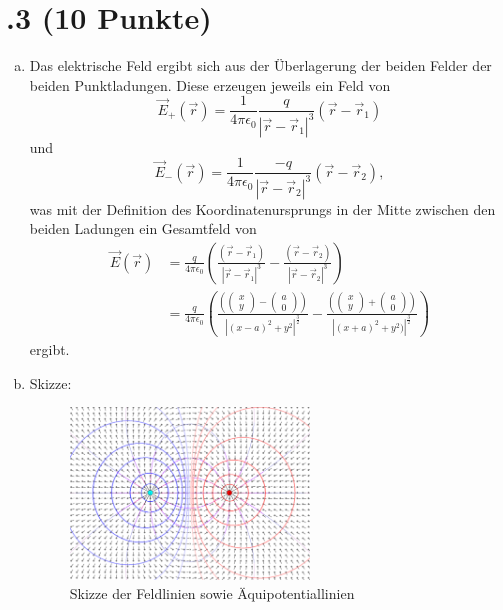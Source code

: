 \section*{\nr.3 \titthree (10 Punkte)}
\begin{enumerate}[(a)]
\item Das elektrische Feld ergibt sich aus der Überlagerung der beiden Felder der beiden Punktladungen. Diese erzeugen jeweils ein Feld von
\begin{equation}
  \vec E_+(\vec r)= \frac{1}{4 \pi \epsilon_0}\frac{q}{|\vec r - \vec r_1|^3}(\vec r - \vec r_1)
\end{equation}
und
\begin{equation}
  \vec E_-(\vec r)= \frac{1}{4 \pi \epsilon_0}\frac{-q}{|\vec r - \vec r_2|^3}(\vec r - \vec r_2),
\end{equation}
was mit der Definition des Koordinatenursprungs in der Mitte zwischen den beiden Ladungen ein Gesamtfeld von
\begin{align}
  \vec E(\vec r) &= \frac{q}{4 \pi \epsilon_0}\left(\frac{(\vec r - \vec r_1)}{|\vec r - \vec r_1|^3}-\frac{(\vec r - \vec r_2)}{|\vec r - \vec r_2|^3}\right) \\  
  &= \frac{q}{4 \pi \epsilon_0}\left(\frac{\left(\begin{pmatrix} x\\y \end{pmatrix} - \begin{pmatrix} a\\0 \end{pmatrix}\right)}{|(x-a)^2+y^2|^{\frac{3}{2}}}-\frac{\left(\begin{pmatrix} x\\y \end{pmatrix} + \begin{pmatrix} a\\0 \end{pmatrix}\right)}{|(x+a)^2+y^2)|^{\frac{3}{2}}}\right)
\end{align}
ergibt.

\item Skizze:

    \begin{figure}[H]
    \begin{center}
    \includegraphics[width=0.6\textwidth]{Aufgaben/Skizze.png}
    \caption{Skizze der Feldlinien sowie Äquipotentiallinien}
    \label{f:times}
    \end{center}
    \end{figure}


\end{enumerate}
